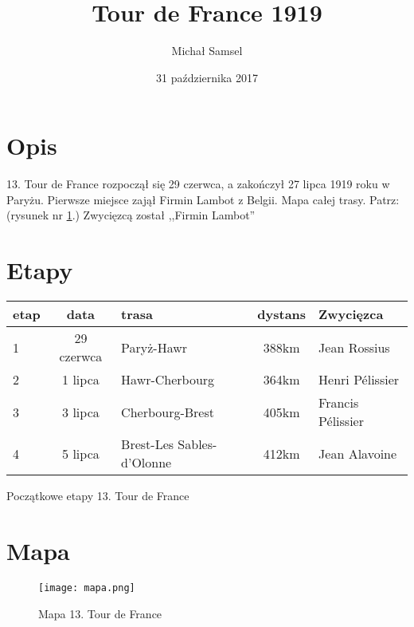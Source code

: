 \documentclass[a4paper,12pt]{article}\upshape
\title{Tour de France 1919}
\author{Michał Samsel}
\date{31 października 2017}
\begin{document}
\maketitle
\begin{abstract}
\tableofcontents
\end{abstract}
	
	
	
\section{Opis}
13. Tour de France rozpoczął się 29 czerwca, a zakończył 27 lipca 1919 roku w Paryżu. Pierwsze miejsce zajął Firmin Lambot z Belgii. Mapa całej trasy. Patrz:(rysunek nr \ref{fig:mapa}.) Zwycięzcą został ,,Firmin Lambot''



\section{Etapy}
	\begin {tabular}{lclcl}
			\hline
			etap	&  data & trasa & dystans & Zwycięzca\\
			\hline
			1 & 29 czerwca & Paryż-Hawr & 388km & Jean Rossius\\
			2 & 1 lipca & Hawr-Cherbourg & 364km & Henri Pélissier\\
			3 & 3 lipca & Cherbourg-Brest & 405km & Francis Pélissier\\
			4 & 5 lipca & Brest-Les Sables-d’Olonne & 412km & Jean Alavoine\\
			\hline
		\end{tabular}
	\caption{Początkowe etapy 13. Tour de France}



\section{Mapa}
	\begin{figure}
		\begin{center}
	\texttt{[image: mapa.png]}
		\end{center}
	\caption{Mapa 13. Tour de France}
	\label{fig:mapa}
	\end{figure}
\end{document}
